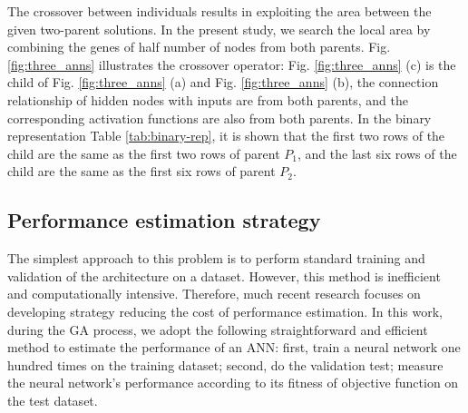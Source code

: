 The crossover between individuals results in exploiting the area between the
given two-parent solutions. In the present study, we search the local area by
combining the genes of half number of nodes from both parents.  Fig.
\ref{fig:three_anns} illustrates the crossover operator: Fig.
\ref{fig:three_anns} (c) is the child of Fig. \ref{fig:three_anns} (a) and Fig.
\ref{fig:three_anns} (b), the connection relationship of hidden nodes with
inputs are from both parents,  and the corresponding activation functions are
also from both parents. In the binary representation Table \ref{tab:binary-rep},
it is shown that the first two rows of the child are the same as the first two
rows of parent $P_1$, and the last six rows of the child are the same as the
first six rows of parent $P_2$.

\subsection{Performance estimation strategy}
The simplest approach to this problem is to perform standard training and
validation of the architecture on a dataset. However, this method is inefficient
and computationally intensive. Therefore, much recent
research\cite{baker2017accelerating} focuses on developing strategy reducing the
cost of performance estimation. In this work, during the GA process, we adopt
the following straightforward and efficient method to estimate the performance
of an ANN: first, train a neural network one hundred times on the training
dataset; second, do the validation test; measure the neural network's
performance according to its fitness of objective function on the test dataset.  


